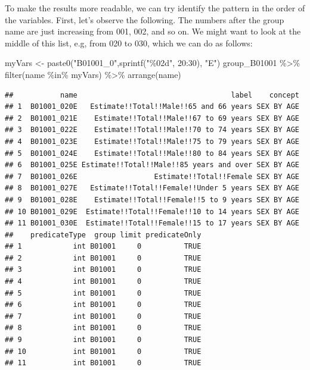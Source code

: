 \documentclass[
  openany]{book}
\newenvironment{Shaded}{\begin{snugshade}}{\end{snugshade}}
\newcommand{\DecValTok}[1]{\textcolor[rgb]{0.00,0.00,0.81}{#1}}
\newcommand{\FunctionTok}[1]{\textcolor[rgb]{0.00,0.00,0.00}{#1}}
\newcommand{\NormalTok}[1]{#1}
\newcommand{\OtherTok}[1]{\textcolor[rgb]{0.56,0.35,0.01}{#1}}
\newcommand{\SpecialCharTok}[1]{\textcolor[rgb]{0.00,0.00,0.00}{#1}}
\newcommand{\StringTok}[1]{\textcolor[rgb]{0.31,0.60,0.02}{#1}}
\begin{document}
To make the results more readable, we can try identify the pattern in the order of the variables. First, let's observe the following. The numbers after the group name are just increasing from 001, 002, and so on. We might want to look at the middle of this list, e.g, from 020 to 030, which we can do as follows:

\begin{Shaded}
\begin{Highlighting}[]
\NormalTok{myVars }\OtherTok{\textless{}{-}} \FunctionTok{paste0}\NormalTok{(}\StringTok{"B01001\_0"}\NormalTok{,}\FunctionTok{sprintf}\NormalTok{(}\StringTok{"\%02d"}\NormalTok{, }\DecValTok{20}\SpecialCharTok{:}\DecValTok{30}\NormalTok{), }\StringTok{"E"}\NormalTok{)}
\NormalTok{group\_B01001 }\SpecialCharTok{\%\textgreater{}\%} \FunctionTok{filter}\NormalTok{(name }\SpecialCharTok{\%in\%}\NormalTok{ myVars) }\SpecialCharTok{\%\textgreater{}\%} \FunctionTok{arrange}\NormalTok{(name)}
\end{Highlighting}
\end{Shaded}

\begin{verbatim}
##           name                                    label    concept
## 1  B01001_020E   Estimate!!Total!!Male!!65 and 66 years SEX BY AGE
## 2  B01001_021E    Estimate!!Total!!Male!!67 to 69 years SEX BY AGE
## 3  B01001_022E    Estimate!!Total!!Male!!70 to 74 years SEX BY AGE
## 4  B01001_023E    Estimate!!Total!!Male!!75 to 79 years SEX BY AGE
## 5  B01001_024E    Estimate!!Total!!Male!!80 to 84 years SEX BY AGE
## 6  B01001_025E Estimate!!Total!!Male!!85 years and over SEX BY AGE
## 7  B01001_026E                  Estimate!!Total!!Female SEX BY AGE
## 8  B01001_027E   Estimate!!Total!!Female!!Under 5 years SEX BY AGE
## 9  B01001_028E    Estimate!!Total!!Female!!5 to 9 years SEX BY AGE
## 10 B01001_029E  Estimate!!Total!!Female!!10 to 14 years SEX BY AGE
## 11 B01001_030E  Estimate!!Total!!Female!!15 to 17 years SEX BY AGE
##    predicateType  group limit predicateOnly
## 1            int B01001     0          TRUE
## 2            int B01001     0          TRUE
## 3            int B01001     0          TRUE
## 4            int B01001     0          TRUE
## 5            int B01001     0          TRUE
## 6            int B01001     0          TRUE
## 7            int B01001     0          TRUE
## 8            int B01001     0          TRUE
## 9            int B01001     0          TRUE
## 10           int B01001     0          TRUE
## 11           int B01001     0          TRUE
\end{verbatim}
\end{document}
